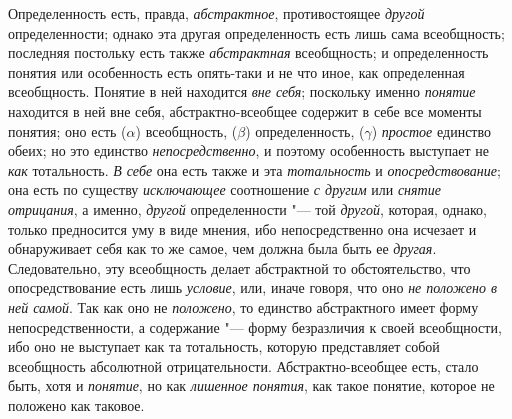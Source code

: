 Определенность есть, правда,
{\em абстрактное},
противостоящее
{\em другой}
определенности; однако эта другая определенность есть лишь
сама всеобщность; последняя постольку есть также
{\em абстрактная}
всеобщность; и определенность понятия или особенность есть
опять-таки и не что иное, как определенная всеобщность. Понятие в ней
находится {\em вне себя};
поскольку именно
{\em понятие} находится в
ней вне себя, абстрактно-всеобщее содержит в себе все моменты понятия; оно
есть ($\alpha $) всеобщность, ($\beta $) определенность, ($\gamma $)
{\em простое} единство
обеих; но это единство
{\em непосредственно}, и
поэтому особенность выступает не
{\em как} тотальность.
{\em В себе} она есть
также и эта {\em тотальность}
и {\em опосредствование};
она есть по существу
{\em исключающее}
соотношение {\em с
другим} или {\em снятие
отрицания}, а именно,
{\em другой}
определенности "--- той
{\em другой}, которая,
однако, только предносится уму в виде мнения, ибо непосредственно она
исчезает и обнаруживает себя как то же самое, чем должна была быть ее
{\em другая}.
Следовательно, эту всеобщность делает абстрактной то
обстоятельство, что опосредствование есть лишь
{\em условие}, или, иначе
говоря, что оно {\em не положено в ней
самой}. Так как оно не
{\em положено}, то
единство абстрактного имеет форму непосредственности, а содержание
"--- форму безразличия к своей всеобщности, ибо оно не выступает
как та тотальность, которую представляет собой всеобщность абсолютной
отрицательности. Абстрактно-всеобщее есть, стало быть, хотя и
{\em понятие}, но как
{\em лишенное понятия},
как такое понятие, которое не положено как таковое.

